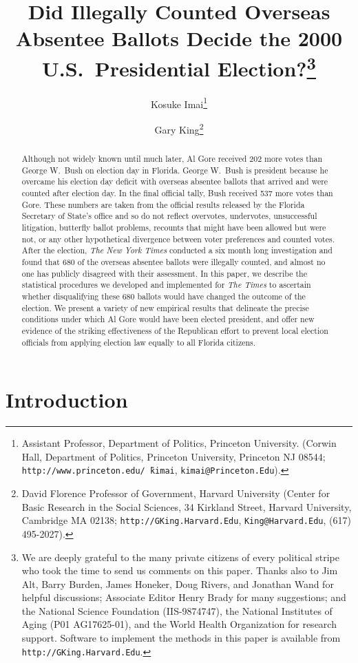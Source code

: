 \documentclass[11pt,titlepage]{article}
\title{Did Illegally Counted Overseas Absentee Ballots Decide the 2000
  U.S.\ Presidential Election?\thanks{We are deeply grateful to the
    many private citizens of every political stripe who took the time
    to send us comments on this paper.  Thanks also to Jim Alt, Barry
    Burden, James Honeker, Doug Rivers, and Jonathan Wand for helpful
    discussions; Associate Editor Henry Brady for many suggestions;
    and the National Science Foundation (IIS-9874747), the National
    Institutes of Aging (P01 AG17625-01), and the World Health
    Organization for research support.  Software to implement the
    methods in this paper is available from
    \texttt{http://GKing.Harvard.Edu}.}}
\author{Kosuke Imai\thanks{Assistant Professor, Department of Politics,
    Princeton University. (Corwin Hall, Department of Politics,
    Princeton University, Princeton NJ 08544;
    \texttt{http://www.princeton.edu/\~\,kimai},
    \texttt{kimai@Princeton.Edu}).}
\and %
Gary King\thanks{David Florence Professor of Government, Harvard
  University (Center for Basic Research in the Social Sciences, 34
  Kirkland Street, Harvard University, Cambridge MA 02138;
  \texttt{http://GKing.Harvard.Edu}, \texttt{King@Harvard.Edu}, (617)
  495-2027).}  }
\begin{document}
\maketitle
{}\baselineskip

\begin{abstract}
  Although not widely known until much later, Al Gore received 202
  more votes than George W.\ Bush on election day in Florida.  George
  W.\ Bush is president because he overcame his election day deficit
  with overseas absentee ballots that arrived and were counted after
  election day.  In the final official tally, Bush received 537 more
  votes than Gore.  These numbers are taken from the official results
  released by the Florida Secretary of State's office and so do not
  reflect overvotes, undervotes, unsuccessful litigation, butterfly
  ballot problems, recounts that might have been allowed but were not,
  or any other hypothetical divergence between voter preferences and
  counted votes.  After the election, \emph{The New York Times}
  conducted a six month long investigation and found that 680 of the
  overseas absentee ballots were illegally counted, and almost no one
  has publicly disagreed with their assessment.  In this paper, we
  describe the statistical procedures we developed and implemented for
  \emph{The Times} to ascertain whether disqualifying these 680
  ballots would have changed the outcome of the election.  We present
  a variety of new empirical results that delineate the precise
  conditions under which Al Gore would have been elected president,
  and offer new evidence of the striking effectiveness of the
  Republican effort to prevent local election officials from applying
  election law equally to all Florida citizens.
\end{abstract}


\section{Introduction}
\end{document}
